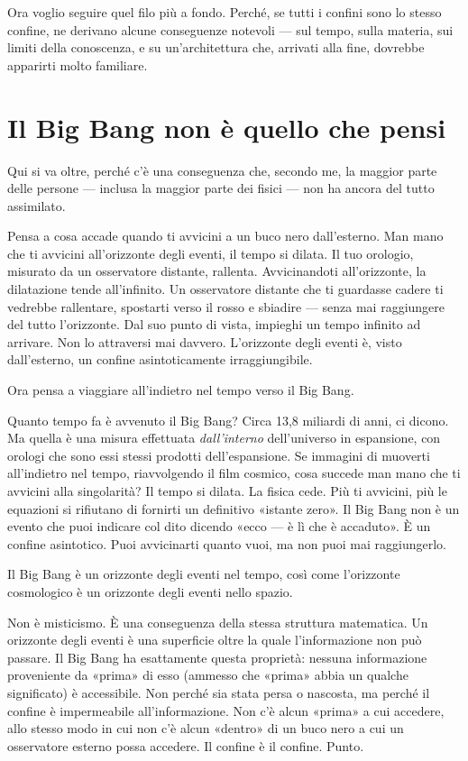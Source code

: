 \documentclass[11pt, twoside, openright]{book}
\begin{document}
Ora voglio seguire quel filo più a fondo. Perché, se tutti i confini sono lo stesso confine, ne derivano alcune conseguenze notevoli --- sul tempo, sulla materia, sui limiti della conoscenza, e su un'architettura che, arrivati alla fine, dovrebbe apparirti molto familiare.


\section*{Il Big Bang non è quello che pensi}

Qui si va oltre, perché c'è una conseguenza che, secondo me, la maggior parte delle persone --- inclusa la maggior parte dei fisici --- non ha ancora del tutto assimilato.

Pensa a cosa accade quando ti avvicini a un buco nero dall'esterno. Man mano che ti avvicini all'orizzonte degli eventi, il tempo si dilata. Il tuo orologio, misurato da un osservatore distante, rallenta. Avvicinandoti all'orizzonte, la dilatazione tende all'infinito. Un osservatore distante che ti guardasse cadere ti vedrebbe rallentare, spostarti verso il rosso e sbiadire --- senza mai raggiungere del tutto l'orizzonte. Dal suo punto di vista, impieghi un tempo infinito ad arrivare. Non lo attraversi mai davvero. L'orizzonte degli eventi è, visto dall'esterno, un confine asintoticamente irraggiungibile.

Ora pensa a viaggiare all'indietro nel tempo verso il Big Bang.

Quanto tempo fa è avvenuto il Big Bang? Circa 13,8 miliardi di anni, ci dicono. Ma quella è una misura effettuata \textit{dall'interno} dell'universo in espansione, con orologi che sono essi stessi prodotti dell'espansione. Se immagini di muoverti all'indietro nel tempo, riavvolgendo il film cosmico, cosa succede man mano che ti avvicini alla singolarità? Il tempo si dilata. La fisica cede. Più ti avvicini, più le equazioni si rifiutano di fornirti un definitivo «istante zero». Il Big Bang non è un evento che puoi indicare col dito dicendo «ecco --- è lì che è accaduto». È un confine asintotico. Puoi avvicinarti quanto vuoi, ma non puoi mai raggiungerlo.

Il Big Bang è un orizzonte degli eventi nel tempo, così come l'orizzonte cosmologico è un orizzonte degli eventi nello spazio.

Non è misticismo. È una conseguenza della stessa struttura matematica. Un orizzonte degli eventi è una superficie oltre la quale l'informazione non può passare. Il Big Bang ha esattamente questa proprietà: nessuna informazione proveniente da «prima» di esso (ammesso che «prima» abbia un qualche significato) è accessibile. Non perché sia stata persa o nascosta, ma perché il confine è impermeabile all'informazione. Non c'è alcun «prima» a cui accedere, allo stesso modo in cui non c'è alcun «dentro» di un buco nero a cui un osservatore esterno possa accedere. Il confine è il confine. Punto.
\end{document}
